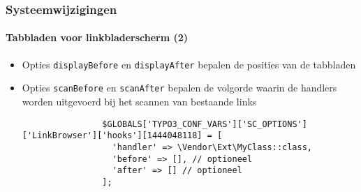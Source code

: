 \begin{frame}[fragile]
	\frametitle{Systeemwijzigingen}
	\framesubtitle{Tabbladen voor linkbladerscherm (2)}

	\lstset{basicstyle=\tiny\ttfamily}

	\begin{itemize}

		\item Opties \texttt{displayBefore} en \texttt{displayAfter} bepalen de posities van de tabbladen

		\item Opties \texttt{scanBefore} en \texttt{scanAfter} bepalen de volgorde waarin de handlers
			worden uitgevoerd bij het scannen van bestaande links

			\begin{lstlisting}
				$GLOBALS['TYPO3_CONF_VARS']['SC_OPTIONS']['LinkBrowser']['hooks'][1444048118] = [
				  'handler' => \Vendor\Ext\MyClass::class,
				  'before' => [], // optioneel
				  'after' => [] // optioneel
				];
			\end{lstlisting}

	\end{itemize}

\end{frame}


